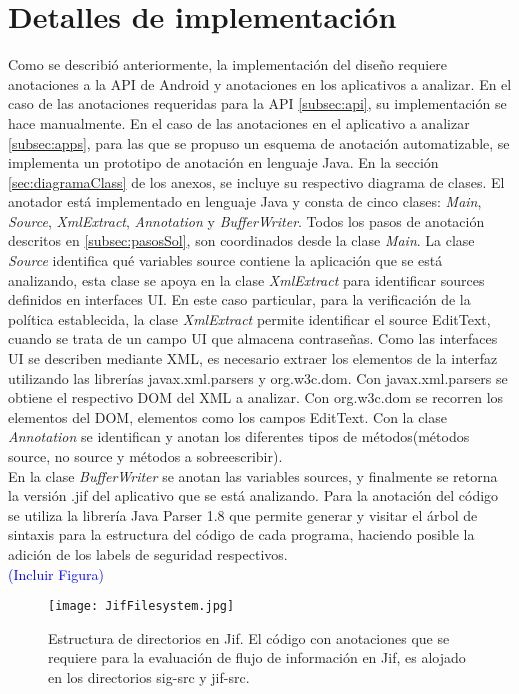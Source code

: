 \section{Detalles de implementación}
Como se describió anteriormente, la implementación del diseño requiere
anotaciones a la API de Android y anotaciones en los aplicativos a
analizar.\newline 
En el caso de las anotaciones requeridas para la API \ref{subsec:api}, su
implementación se hace manualmente.\newline
En el caso de las anotaciones en el aplicativo a analizar \ref{subsec:apps},
para las que se propuso un esquema de anotación automatizable, se implementa un
prototipo de anotación en lenguaje Java. En la sección \ref{sec:diagramaClass}
de los anexos, se incluye su respectivo diagrama de clases.\newline 
El anotador está implementado en lenguaje Java y consta de cinco clases:
\emph{Main}, \emph{Source}, \emph{XmlExtract}, \emph{Annotation} y
\emph{BufferWriter}.\newline 
Todos los pasos de anotación descritos en
\ref{subsec:pasosSol}, son coordinados desde la clase \emph{Main}.\newline
La clase \emph{Source} identifica qué variables source contiene la aplicación que se
está analizando, esta clase se apoya en la clase \emph{XmlExtract} para identificar
sources definidos en interfaces UI. En este caso particular, para la
verificación de la política establecida, la clase \emph{XmlExtract} permite identificar
el source EditText, cuando se trata de un campo UI que almacena
contraseñas.\newline 
Como las interfaces UI se describen mediante XML, es
necesario extraer los elementos de la interfaz utilizando las librerías javax.xml.parsers y
org.w3c.dom. Con javax.xml.parsers se obtiene el respectivo DOM del XML a
analizar. Con org.w3c.dom se recorren los elementos del DOM, elementos como los
campos EditText.\newline 
Con la clase \emph{Annotation}  se identifican y anotan los diferentes tipos de
métodos(métodos source, no source y métodos a sobreescribir).\\
En la clase \emph{BufferWriter} se anotan las variables sources, y finalmente
se retorna la versión .jif del aplicativo que se está analizando.\newline 
Para la anotación del código se utiliza la librería Java Parser 1.8  que permite
generar y visitar el árbol de sintaxis para la estructura del código de cada
programa, haciendo posible la adición de los labels de seguridad respectivos.\\
\textcolor{blue}{(Incluir Figura)}\newline 
\label{subsec:anotador}
\begin{figure}[t!]
	\begin{center}
	\texttt{[image: JifFilesystem.jpg]}
	\end{center}
	\caption{Estructura de directorios en Jif.
	El código con anotaciones que se requiere para la evaluación de flujo de
	información en Jif, es alojado en los directorios sig-src y jif-src.}
	\label{fig:jifFilesystem} 
\end{figure}

